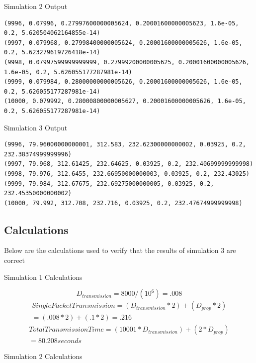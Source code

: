 \documentclass[12pt]{article}
\begin{document}
\centerline{Simulation 2 Output}
\begin{verbatim}
(9996, 0.07996, 0.27997600000005624, 0.20001600000005623, 1.6e-05, 0.2, 5.620504062164855e-14)
(9997, 0.079968, 0.27998400000005624, 0.20001600000005626, 1.6e-05, 0.2, 5.623279619726418e-14)
(9998, 0.07997599999999999, 0.27999200000005625, 0.20001600000005626, 1.6e-05, 0.2, 5.626055177287981e-14)
(9999, 0.079984, 0.28000000000005626, 0.20001600000005626, 1.6e-05, 0.2, 5.626055177287981e-14)
(10000, 0.079992, 0.28000800000005627, 0.20001600000005626, 1.6e-05, 0.2, 5.626055177287981e-14)
\end{verbatim}

\centerline{Simulation 3 Output}
\begin{verbatim}
(9996, 79.96000000000001, 312.583, 232.62300000000002, 0.03925, 0.2, 232.38374999999996)
(9997, 79.968, 312.61425, 232.64625, 0.03925, 0.2, 232.40699999999998)
(9998, 79.976, 312.6455, 232.66950000000003, 0.03925, 0.2, 232.43025)
(9999, 79.984, 312.67675, 232.69275000000005, 0.03925, 0.2, 232.45350000000002)
(10000, 79.992, 312.708, 232.716, 0.03925, 0.2, 232.47674999999998)
\end{verbatim}

\subsection{Calculations}
Below are the calculations used to verify that the results of simulation 3 are correct\\
\centerline{Simulation 1 Calculations}

\begin{equation}
D_{transmission} = 8000 / (10^6) = .008
\end{equation}
\begin{equation}
\begin{split}
SinglePacketTransmission = ( D_{transmission} * 2) + (D_{prop} * 2) \\= (.008 * 2) + (.1 * 2) = .216
\end{split}
\end{equation}
\begin{equation}
\begin{split}
TotalTransmissionTime = (10001 * D_{transmission}) + (2 * D_{prop}) \\= 80.208 seconds
\end{split}
\end{equation}

\centerline{Simulation 2 Calculations}
\end{document}
